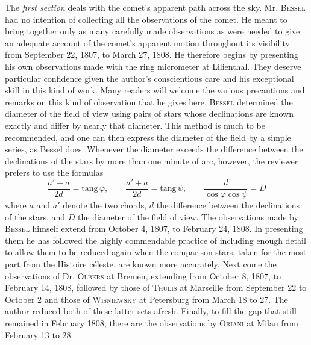 The \emph{first section} deals with the comet's apparent path across the sky. Mr. \textsc{Bessel} had no intention of collecting all the observations of the comet. He meant to bring together only as many carefully made observations as were needed to give an adequate account of the comet's apparent motion throughout its visibility from September 22, 1807, to March 27, 1808. He therefore begins by presenting his own observations made with the ring micrometer at Lilienthal. They deserve particular confidence given the author's conscientious care and his exceptional skill in this kind of work. Many readers will welcome the various precautions and remarks on this kind of observation that he gives here. \textsc{Bessel} determined the diameter of the field of view using pairs of stars whose declinations are known exactly and differ by nearly that diameter. This method is much to be recommended, and one can then express the diameter of the field by a simple series, as Bessel does. Whenever the diameter exceeds the difference between the declinations of the stars by more than one minute of arc, however, the reviewer prefers to use the formulas \[
\frac{a'-a}{2d}=\mathrm{tang}\,\varphi,\qquad \frac{a'+a}{2d}=\mathrm{tang}\,\psi,\qquad \frac{d}{\cos\varphi\cos\psi}=D
\] where $a$ and $a'$ denote the two chords, $d$ the difference between the declinations of the stars, and $D$ the diameter of the field of view. The observations made by \textsc{Bessel} himself extend from October 4, 1807, to February 24, 1808. In presenting them he has followed the highly commendable practice of including enough detail to allow them to be reduced again when the comparison stars, taken for the most part from the Histoire céleste, are known more accurately. Next come the observations of Dr. \textsc{Olbers} at Bremen, extending from October 8, 1807, to February 14, 1808, followed by those of \textsc{Thulis} at Marseille from September 22 to October 2 and those of \textsc{Wisniewsky} at Petersburg from March 18 to 27. The author reduced both of these latter sets afresh. Finally, to fill the gap that still remained in February 1808, there are the observations by \textsc{Oriani} at Milan from February 13 to 28.

